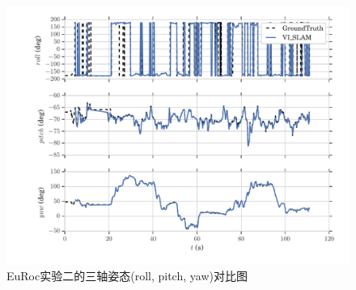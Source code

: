 \begin{figure}[!h]
	\centering
	\includegraphics[width=1.0\textwidth]{figures/chapter5/rpy_mh05}
	\caption{EuRoc实验二的三轴姿态(roll, pitch, yaw)对比图}\label{fig5_10}
\end{figure}

